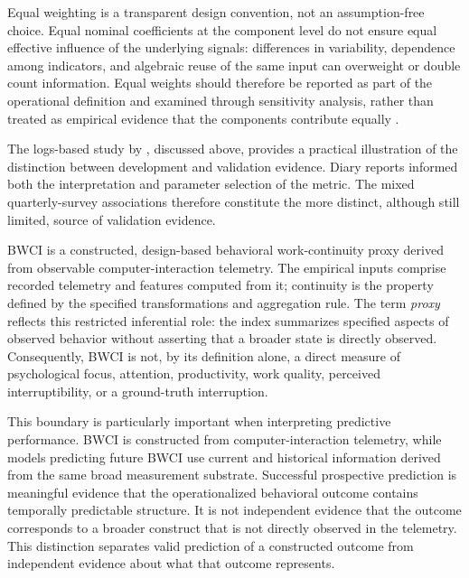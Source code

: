 Equal weighting is a transparent design convention, not an assumption-free choice. Equal nominal coefficients at the component level do not ensure equal effective influence of the underlying signals: differences in variability, dependence among indicators, and algebraic reuse of the same input can overweight or double count information. Equal weights should therefore be reported as part of the operational definition and examined through sensitivity analysis, rather than treated as empirical evidence that the components contribute equally \parencite{oecd2008compositeIndicators}.

The logs-based study by \textcite{brown2023focusedWork}, discussed above, provides a practical illustration of the distinction between development and validation evidence. Diary reports informed both the interpretation and parameter selection of the metric. The mixed quarterly-survey associations therefore constitute the more distinct, although still limited, source of validation evidence.

BWCI is a constructed, design-based behavioral work-continuity proxy derived from observable computer-interaction telemetry. The empirical inputs comprise recorded telemetry and features computed from it; continuity is the property defined by the specified transformations and aggregation rule. The term \emph{proxy} reflects this restricted inferential role: the index summarizes specified aspects of observed behavior without asserting that a broader state is directly observed. Consequently, BWCI is not, by its definition alone, a direct measure of psychological focus, attention, productivity, work quality, perceived interruptibility, or a ground-truth interruption.

This boundary is particularly important when interpreting predictive performance. BWCI is constructed from computer-interaction telemetry, while models predicting future BWCI use current and historical information derived from the same broad measurement substrate. Successful prospective prediction is meaningful evidence that the operationalized behavioral outcome contains temporally predictable structure. It is not independent evidence that the outcome corresponds to a broader construct that is not directly observed in the telemetry. This distinction separates valid prediction of a constructed outcome from independent evidence about what that outcome represents.

